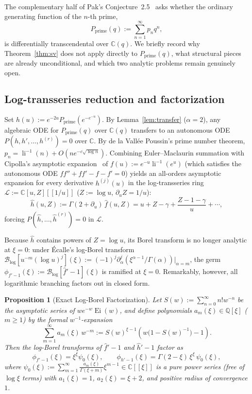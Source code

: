 \documentclass[10pt,reqno]{amsart}
\numberwithin{equation}{section}
\newtheorem{proposition}{Proposition}[section]
\theoremstyle{definition}
\newcommand{\Q}{\mathbb{Q}}
\newcommand{\C}{\mathbb{C}}
\newcommand{\cB}{\mathcal{B}}
\newcommand{\cL}{\mathcal{L}}
\DeclareMathOperator{\li}{li}
\DeclareMathOperator{\Ei}{Ei}
\begin{document}
The complementary half of Pak's Conjecture~2.5~\cite{Pak2018} asks whether the ordinary generating function of the $n$-th prime,
\[
  P_{\mathrm{prime}}(q) := \sum_{n=1}^\infty p_n q^n,
\]
is differentially transcendental over $\C(q)$. We briefly record why Theorem~\ref{thm:sv} does not apply directly to $P_{\mathrm{prime}}(q)$, what structural pieces are already unconditional, and which two analytic problems remain genuinely open.

\subsection{Log-transseries reduction and factorization}
Set $h(u) := e^{-2u} P_{\mathrm{prime}}(e^{-e^{-u}})$. By Lemma~\ref{lem:transfer} ($\alpha = 2$), any algebraic ODE for $P_{\mathrm{prime}}(q)$ over $\C(q)$ transfers to an autonomous ODE $P(h, h', \dots, h^{(r)}) = 0$ over $\C$. By de la Vall\'ee Poussin's prime number theorem, $p_n = \li^{-1}(n) + O(n e^{-c\sqrt{\log n}})$. Combining Euler--Maclaurin summation with Cipolla's asymptotic expansion~\cite{Cipolla1902} of $f(u) := e^{-u}\li^{-1}(e^u)$ (which satisfies the autonomous ODE $f f'' + f f' - f - f' = 0$) yields an all-orders asymptotic expansion for every derivative $h^{(j)}(u)$ in the log-transseries ring $\cL := \C[u, Z][[1/u]]$ ($Z := \log u$, $\partial_u Z = 1/u$):
\[
  \widehat{h}(u, Z) := \Gamma(2 + \partial_u)\,\widehat{f}(u, Z) = u + Z - \gamma + \frac{Z - 1 - \gamma}{u} + \cdots,
\]
forcing $P(\widehat{h}, \dots, \widehat{h}^{(r)}) = 0$ in $\cL$.

Because $\widehat{h}$ contains powers of $Z = \log u$, its Borel transform is no longer analytic at $\xi = 0$: under \'Ecalle's log-Borel transform $\cB_{\log}[u^{-m}(\log u)^j](\xi) := (-1)^j \partial_\alpha^j(\xi^{\alpha-1}/\Gamma(\alpha))|_{\alpha = m}$, the germ $\phi_{f'-1}(\xi) := \cB_{\log}[\widehat{f}' - 1](\xi)$ is ramified at $\xi = 0$. Remarkably, however, all logarithmic branching factors out in closed form.

\begin{proposition}[Exact Log-Borel Factorization]\label{prop:log-factor}
Let $S(w) := \sum_{n=0}^\infty n! w^{-n}$ be the asymptotic series of $w e^{-w}\Ei(w)$, and define polynomials $a_m(\xi) \in \Q[\xi]$ ($m \ge 1$) by the formal $w^{-1}$-expansion
\[
  \sum_{m=1}^\infty a_m(\xi)\, w^{-m} := S(w)^{\xi - 1}\!\left(w\bigl(1 - S(w)^{-1}\bigr) - 1\right).
\]
Then the log-Borel transforms of $\widehat{f}' - 1$ and $\widehat{h}' - 1$ factor as
\begin{equation}\label{eq:log-factor}
  \phi_{f'-1}(\xi) = \xi^\xi \psi_0(\xi), \qquad
  \phi_{h'-1}(\xi) = \Gamma(2 - \xi)\, \xi^\xi\, \psi_0(\xi),
\end{equation}
where $\psi_0(\xi) := \sum_{m=1}^\infty \frac{a_m(\xi)}{\Gamma(\xi + m)} \xi^{m-1} \in \C[[\xi]]$ is a pure power series (free of $\log\xi$ terms) with $a_1(\xi) = 1$, $a_2(\xi) = \xi + 2$, and positive radius of convergence $1$.
\end{proposition}
\end{document}

